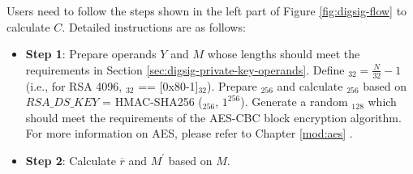 \documentclass[main\_\_EN.tex]{subfiles}
\begin{document}
Users need to follow the steps shown in the left part of Figure \ref{fig:digsig-flow} to calculate \begin{math}C\end{math}. Detailed instructions are as follows:

\begin{itemize}

    \item {\bfseries Step 1}: Prepare operands \begin{math}Y\end{math} and \begin{math}M\end{math} whose lengths should meet the requirements in Section \ref{sec:digsig-private-key-operands}. Define \begin{math}[L]_{32} = \frac{N}{32}-1 \end{math} (i.e., for RSA 4096, \begin{math}[L]_{32}\end{math} == [0x80-1]\begin{math}_{32}\end{math}). Prepare \begin{math}[HMAC\_KEY]_{256}\end{math} and calculate \begin{math}[RSA\_DS\_KEY]_{256}\end{math} based on \begin{math}RSA\_DS\_KEY\end{math} = HMAC-SHA256 (\begin{math}[HMAC\_KEY]_{256}\end{math}, \begin{math}1^{256}\end{math}). Generate a random \begin{math}[IV]_{128}\end{math} which should meet the requirements of the AES-CBC block encryption algorithm. For more information on AES, please refer to Chapter \ref{mod:aes} \textit{}.

    \item {\bfseries Step 2}: Calculate \begin{math}\overline{r}\end{math} and \begin{math}M^{\prime} \end{math} based on \begin{math}M\end{math}.



\end{itemize}
\end{document}
